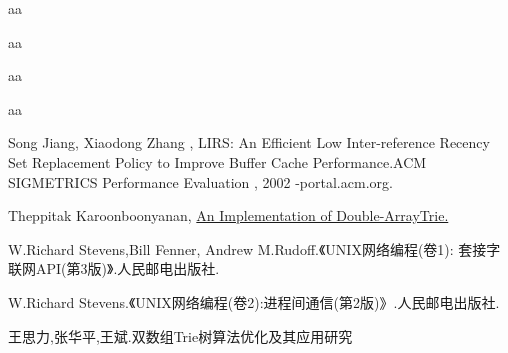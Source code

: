 \documentclass[12pt, a4paper, titlepage]{article}
\begin{document}






\begin{asparaenum}[1.]
\item{aa}
\item{aa}
\item{aa}
\item{aa}
\end{asparaenum}



\newpage
\begin{thebibliography}{9}
Song Jiang, Xiaodong Zhang , LIRS: An Efficient Low Inter-reference 
	Recency Set Replacement Policy to Improve Buffer Cache Performance.ACM 
	SIGMETRICS Performance Evaluation , 2002 -portal.acm.org.\par
{}Theppitak Karoonboonyanan,
\href{http://linux.thai.net/~thep/datrie/datrie.html}{An Implementation of 
	Double-ArrayTrie.}\par
{}W.Richard Stevens,Bill Fenner, Andrew M.Rudoff.《UNIX网络编程(卷1):
	套接字联网API(第3版)》.人民邮电出版社.\par
{}W.Richard Stevens.《UNIX网络编程(卷2):进程间通信(第2版)》.人民邮电出版社.\par
{}王思力,张华平,王斌.双数组Trie树算法优化及其应用研究 \par

\end{thebibliography}
\end{document}
